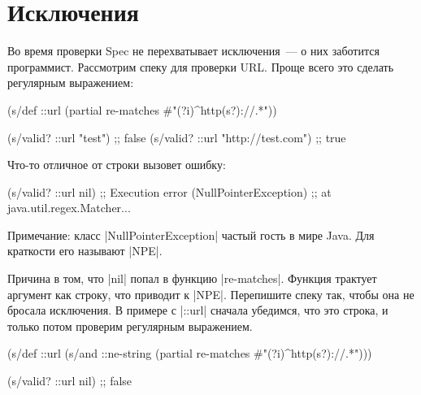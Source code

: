 \section{Исключения}


Во время проверки Spec не перехватывает исключения~--- о них заботится
программист. Рассмотрим спеку для проверки URL. Проще всего это сделать
регулярным выражением:


\begin{english}
  \begin{clojure}
(s/def ::url
  (partial re-matches #"(?i)^http(s?)://.*"))

(s/valid? ::url "test")            ;; false
(s/valid? ::url "http://test.com") ;; true
  \end{clojure}
\end{english}

\noindent
Что-то отличное от строки вызовет ошибку:


\begin{english}
  \begin{clojure}
(s/valid? ::url nil)
;; Execution error (NullPointerException)
;; at java.util.regex.Matcher...
  \end{clojure}
\end{english}


Примечание: класс \spverb|NullPointerException| частый гость в мире Java. Для
краткости его называют \spverb|NPE|.

Причина в том, что \spverb|nil| попал в функцию \spverb|re-matches|. Функция
трактует аргумент как строку, что приводит к \spverb|NPE|. Перепишите спеку так,
чтобы она не бросала исключения. В примере с \spverb|::url| сначала убедимся,
что это строка, и только потом проверим регулярным выражением.

\begin{english}
  \begin{clojure}
(s/def ::url
  (s/and ::ne-string
         (partial re-matches #"(?i)^http(s?)://.*")))

(s/valid? ::url nil) ;; false
  \end{clojure}
\end{english}


